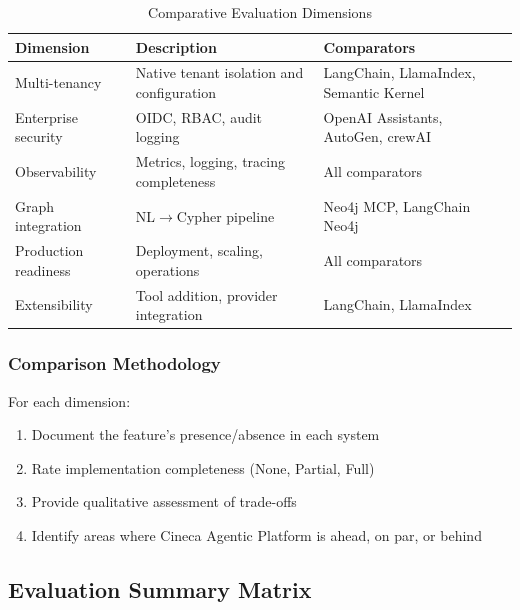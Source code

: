 \documentclass[a4paper,twoside]{sapthesis}
\begin{document}
\begin{table}[htbp]
\centering
\caption{Comparative Evaluation Dimensions}
\label{tab:comparative-eval}
\small
\begin{tabularx}{\textwidth}{|l|X|l|}
\hline
\textbf{Dimension} & \textbf{Description} & \textbf{Comparators} \\
\midrule
Multi-tenancy & Native tenant isolation and configuration & LangChain, LlamaIndex, Semantic Kernel \\
\midrule
Enterprise security & OIDC, RBAC, audit logging & OpenAI Assistants, AutoGen, crewAI \\
\midrule
Observability & Metrics, logging, tracing completeness & All comparators \\
\midrule
Graph integration & NL$\rightarrow$Cypher pipeline & Neo4j MCP, LangChain Neo4j \\
\midrule
Production readiness & Deployment, scaling, operations & All comparators \\
\midrule
Extensibility & Tool addition, provider integration & LangChain, LlamaIndex \\
\midrule
\end{tabularx}
\end{table}

\subsubsection{Comparison Methodology}

For each dimension:
\begin{enumerate}
    \item Document the feature's presence/absence in each system
    \item Rate implementation completeness (None, Partial, Full)
    \item Provide qualitative assessment of trade-offs
    \item Identify areas where Cineca Agentic Platform is ahead, on par, or behind
\end{enumerate}

\subsection{Evaluation Summary Matrix}
\label{subsec:eval-summary}
\end{document}
